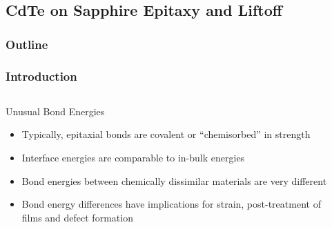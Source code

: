 \documentclass[]{beamer}%
\begin{document}
\subsection{CdTe on Sapphire Epitaxy and Liftoff}
\begin{frame}
    \frametitle{Outline}
\end{frame}
\begin{frame}
    \frametitle{Introduction}
    \begin{columns}
        \begin{column}{0.5\textwidth}
            \begin{block}{Unusual Bond Energies}
                \begin{itemize}[<+-| alert@+>]
            \item Typically, epitaxial bonds are covalent or ``chemisorbed'' in strength
            \item Interface energies are comparable to in-bulk energies
            \item Bond energies between chemically dissimilar materials are very different
            \item Bond energy differences have implications for strain, post-treatment of films and defect formation
                \end{itemize}
            \end{block}
        \end{column}
        \begin{column}{0.5\textwidth}
            \centering
             \\

\end{column}
\end{columns}
\end{frame}
\end{document}
